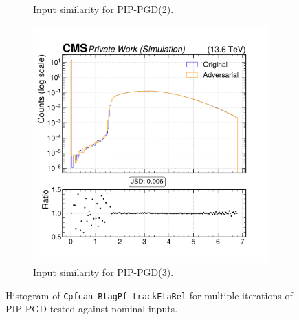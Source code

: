 \begin{figure}[htbp]
\begin{subfigure}[t]{0.32\textwidth}
    \caption*{Input similarity for PIP-PGD(2).}
  \end{subfigure}\hfill
  \begin{subfigure}[t]{0.32\textwidth}
    \includegraphics[width=\linewidth]{media/output/features/compare/combined_it_3/cmp_cpf_arr_Cpfcan_BtagPf_trackEtaRel.pdf}
    \caption*{Input similarity for PIP-PGD(3).}
  \end{subfigure}

  \caption*{Histogram of \texttt{Cpfcan\_BtagPf\_trackEtaRel} for multiple iterations of PIP-PGD tested against nominal inputs.}
  \label{fig:combined_input_Cpfcan_BtagPf_trackEtaRel}
\end{figure}

